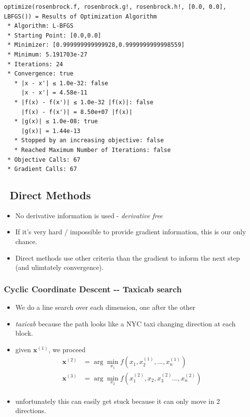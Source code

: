 \documentclass[11pt]{article}
\providecommand{\tightlist}{%
      \setlength{\itemsep}{0pt}\setlength{\parskip}{0pt}}
\begin{document}
    \begin{Verbatim}[commandchars=\\\{\}]
optimize(rosenbrock.f, rosenbrock.g!, rosenbrock.h!, [0.0, 0.0], LBFGS()) = Results of Optimization Algorithm
 * Algorithm: L-BFGS
 * Starting Point: [0.0,0.0]
 * Minimizer: [0.999999999999928,0.9999999999998559]
 * Minimum: 5.191703e-27
 * Iterations: 24
 * Convergence: true
   * |x - x'| ≤ 1.0e-32: false 
     |x - x'| = 4.58e-11 
   * |f(x) - f(x')| ≤ 1.0e-32 |f(x)|: false
     |f(x) - f(x')| = 8.50e+07 |f(x)|
   * |g(x)| ≤ 1.0e-08: true 
     |g(x)| = 1.44e-13 
   * Stopped by an increasing objective: false
   * Reached Maximum Number of Iterations: false
 * Objective Calls: 67
 * Gradient Calls: 67

    \end{Verbatim}

    \subsection{~Direct Methods}\label{direct-methods}

\begin{itemize}
\tightlist
\item
  No derivative information is used - \emph{derivative free}
\item
  If it's very hard / impossible to provide gradient information, this
  is our only chance.
\item
  Direct methods use other criteria than the gradient to inform the next
  step (and ulimtately convergence).
\end{itemize}

    \subsubsection{Cyclic Coordinate Descent -\/- Taxicab
search}\label{cyclic-coordinate-descent----taxicab-search}

\begin{itemize}
\tightlist
\item
  We do a line search over each dimension, one after the other
\item
  \emph{taxicab} because the path looks like a NYC taxi changing
  direction at each block.
\item
  given \(\mathbf{x}^{(1)}\), we proceed \[
  \begin{aligned}
  \mathbf{x}^{(2)} &= \arg \min_{x_1} f(x_1,x_2^{(1)},\dots,x_n^{(1)}) \\
  \mathbf{x}^{(3)} &= \arg \min_{x_2} f(x_1^{(2)},x_2,x_3^{(2)}\dots,x_n^{(2)}) \\    
  \end{aligned}
  \]
\item
  unfortunately this can easily get stuck because it can only move in 2
  directions.
\end{itemize}
\end{document}

